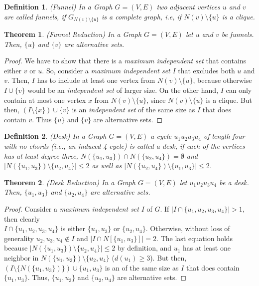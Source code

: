 \documentclass[]{article}
\newtheorem{theorem}{Theorem}
\newtheorem{definition}{Definition}
\begin{document}
\begin{definition} (Funnel)
	In a Graph $G=(V,E)$ two adjacent vertices $u$ and $v$ are called funnels, if $G_{N(v)\setminus\{u\}}$ is a complete graph, i.e, if $N(v)\setminus\{u\}$ is a clique.
\end{definition}
\begin{theorem} (Funnel Reduction) In a Graph $G=(V,E)$ let $u$ and $v$ be funnels. Then, $\{u\}$ and $\{v\}$ are alternative sets.	
\end{theorem}
\begin{proof}
	We have to show that there is a \textit{maximum independent set} that contains either $v$ or $u$. So, consider a \textit{maximum independent set} $I$ that excludes both $u$ and $v$. Then, $I$ has to include at least one vertex from $N(v)\setminus\{u\}$, because otherwise $I\cup\{v\}$ would be an \textit{independent set} of larger size. On the other hand, $I$ can only contain at most one vertex $x$ from $N(v)\setminus\{u\}$, since $N(v)\setminus\{u\}$ is a clique. But then, $(I\setminus\{x\})\cup\{v\}$ is an \textit{independent set} of the same size as $I$ that does contain $v$. Thus $\{u\}$ and $\{v\}$ are alternative sets.
\end{proof}

\begin{definition} (Desk)
	In a Graph $G=(V,E)$ a cycle $u_1u_2u_3u_4$ of length four with no chords (i.e., an induced 4-cycle) is called a desk, if each of the vertices has at least degree three, $N(\{u_1, u_3\})\cap N(\{u_2, u_4\}) = \emptyset$ and $|N(\{u_1, u_3\})\setminus \{u_2, u_4\}|\leq 2$ as well as $|N(\{u_2, u_4\})\setminus \{u_1, u_3\}|\leq 2$.
\end{definition}
\begin{theorem}(Desk Reduction) 
	In a Graph $G=(V,E)$ let $u_1u_2u_3u_4$ be a desk. Then, $\{u_1, u_3\}$ and $\{u_2, u_4\}$ are alternative sets.	
\end{theorem}
\begin{proof}
	Consider a \textit{maximum independent set} $I$ of $G$. If $|I\cap \{u_1,u_2,u_3,u_4\}| > 1$, then clearly\\ $I\cap \{u_1,u_2,u_3,u_4\} $ is either $\{u_1, u_3\}$ or $\{u_2, u_4\}$. Otherwise, without loss of generality $u_2,u_3,u_4\notin I$ and $|I\cap N[\{u_1,u_3\}]|=2$. The last equation holds because $|N(\{u_1, u_3\})\setminus\{u_2,u_4\}| \leq 2$ by definition, and $u_1$ has at least one neighbor in $N(\{u_1, u_3\})\setminus\{u_2,u_4\}$ ($d(u_1)\geq3$). But then, $(I\setminus\{N(\{u_1,u_3\})\})\cup\{u_1,u_3\}$ is an  of the same size as $I$ that does contain $\{u_1, u_3\}$. Thus, $\{u_1,u_3\}$ and $\{u_2, u_4\}$ are alternative sets.
\end{proof}
\end{document}
